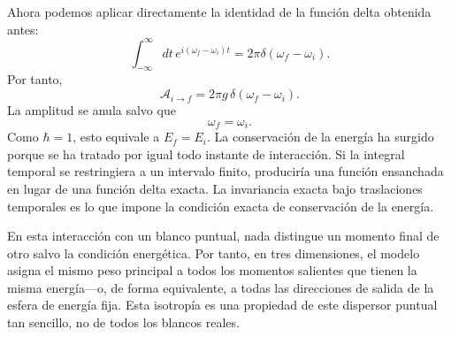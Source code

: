 
Ahora podemos aplicar directamente la identidad de la función delta obtenida antes:
\begin{equation}
\int_{-\infty}^{\infty}dt\,
e^{i(\omega_f-\omega_i)t}
=2\pi\delta(\omega_f-\omega_i).
\end{equation}
Por tanto,
\begin{equation}
\boxed{
\mathcal A_{i\to f}
=2\pi g\,\delta(\omega_f-\omega_i)
}.
\end{equation}
La amplitud se anula salvo que
\begin{equation}
\omega_f=\omega_i.
\end{equation}
Como \(\hbar=1\), esto equivale a \(E_f=E_i\). La conservación de la energía ha surgido porque se ha tratado por igual todo instante de interacción. Si la integral temporal se restringiera a un intervalo finito, produciría una función ensanchada en lugar de una función delta exacta. La invariancia exacta bajo traslaciones temporales es lo que impone la condición exacta de conservación de la energía.

\begin{classroomqa}\end{classroomqa}


En esta interacción con un blanco puntual, nada distingue un momento final de otro salvo la condición energética. Por tanto, en tres dimensiones, el modelo asigna el mismo peso principal a todos los momentos salientes que tienen la misma energía---o, de forma equivalente, a todas las direcciones de salida de la esfera de energía fija. Esta isotropía es una propiedad de este dispersor puntual tan sencillo, no de todos los blancos reales.

